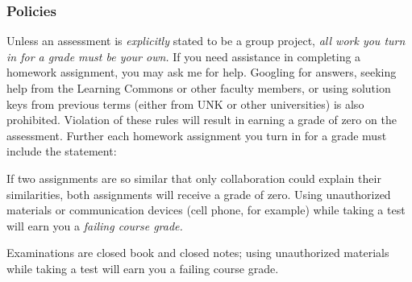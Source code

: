 \documentclass[12pt]{article}
\newcounter{ex}\setcounter{ex}{0}
\begin{document}
\subsubsection* {Policies}

Unless an assessment is \emph{explicitly} stated to be a group project,  \emph{all work you turn in for a grade must be your own.}  If you need assistance in completing a homework assignment, you may ask me for help. Googling for answers, seeking help from the Learning Commons or other faculty members,  or using solution keys from previous terms (either from UNK or other universities) is also prohibited.  Violation of these rules will result in earning a grade of zero on the assessment. Further each homework assignment you turn in for a grade must include the statement:

\begin{quote}
\end{quote}
 If two assignments are so similar that only collaboration could explain their similarities, both assignments will receive a grade of zero.  Using unauthorized materials or communication devices (cell phone, for
example) while taking a test will earn you a \emph{failing course grade.}  


Examinations are closed book and closed notes; using
unauthorized materials while taking a test will earn you a failing
course grade.  
\end{document}
